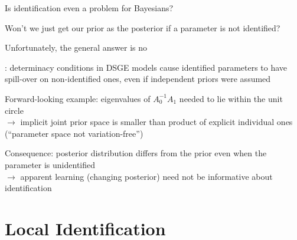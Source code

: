 \documentclass[handout,usepdftitle=false,xcolor=dvipsnames,aspectratio=169]{beamer}
\begin{document}
\begin{frame}{Is identification even a problem for Bayesians?}
  \begin{witemize}
    \item Won't we just get our prior as the posterior if a parameter is not identified?
    \item Unfortunately, the general answer is no
    \item \textcite{KoopEtAl2013}: determinacy conditions in DSGE models cause identified parameters to have spill-over on non-identified ones, even if independent priors were assumed
    \item Forward-looking example: eigenvalues of $A_0^{-1} A_1$ needed to lie within the unit circle\\
    $\rightarrow$ implicit joint prior space is smaller than product of explicit individual ones (``parameter space not variation-free'')
    \item Consequence: posterior distribution differs from the prior even when the
    parameter is unidentified\\
    $\rightarrow$ apparent learning (changing posterior) need not be informative about identification
  \end{witemize}
\end{frame}

\section{Local Identification}
\end{document}
